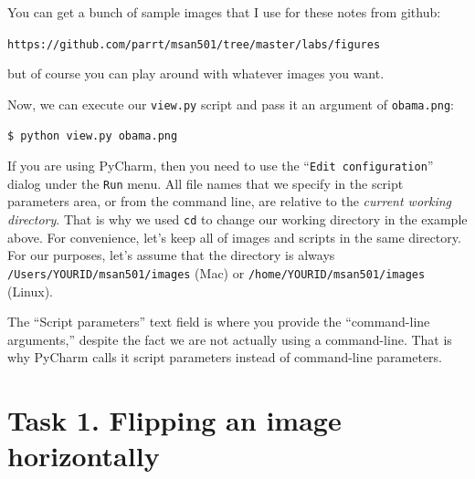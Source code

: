 You can get a bunch of sample images that I use for these notes from github:

{\tt https://github.com/parrt/msan501/tree/master/labs/figures}

\noindent but of course you can play around with whatever images you want.

\noindent Now, we can execute our {\tt view.py} script and pass it an argument of {\tt obama.png}:

\begin{lstlisting}[style=BashInputStyle]
$ python view.py obama.png
\end{lstlisting}

If you are using PyCharm, then you need to use the ``{\tt\small Edit configuration}'' dialog under the {\tt Run} menu.  All file names that we specify in the script parameters area, or from the command line, are relative to the {\em current working directory}. That is why we used {\tt cd} to change our working directory in the example above. For convenience, let's keep all of images and scripts in the same directory. For our purposes, let's assume that the directory is always {\tt\small /Users/YOURID/msan501/images} (Mac) or {\tt\small /home/YOURID/msan501/images} (Linux).


The ``Script parameters'' text field is where you provide the ``command-line arguments,'' despite the fact we are not actually using a command-line. That is why PyCharm calls it script parameters instead of command-line parameters.

\section{Task 1. Flipping an image horizontally}


